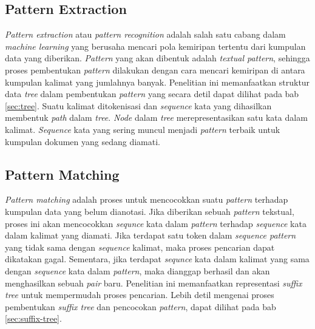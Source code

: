 \subsection{Pattern Extraction}
\textit{Pattern extraction} atau \textit{pattern recognition} adalah salah satu cabang dalam \textit{machine learning} yang berusaha mencari pola kemiripan tertentu dari kumpulan data yang diberikan. \textit{Pattern} yang akan dibentuk adalah \textit{textual pattern}, sehingga proses pembentukan \textit{pattern} dilakukan dengan cara mencari kemiripan di antara kumpulan kalimat yang jumlahnya banyak. Penelitian ini memanfaatkan struktur data \textit{tree} dalam pembentukan \textit{pattern} yang secara detil dapat dilihat pada bab \ref{sec:tree}. Suatu kalimat ditokenisasi dan \textit{sequence} kata yang dihasilkan membentuk \textit{path} dalam \textit{tree}. \textit{Node} dalam \textit{tree} merepresentasikan satu kata dalam kalimat. \textit{Sequence} kata yang sering muncul menjadi \textit{pattern} terbaik untuk kumpulan dokumen yang sedang diamati. 

\subsection{Pattern Matching}
\textit{Pattern matching} adalah proses untuk mencocokkan suatu \textit{pattern} terhadap kumpulan data yang belum dianotasi. Jika diberikan sebuah \textit{pattern} tekstual, proses ini akan mencocokkan \textit{sequnce} kata dalam \textit{pattern} terhadap \textit{sequence} kata dalam kalimat yang diamati. Jika terdapat satu token dalam \textit{sequence pattern} yang tidak sama dengan \textit{sequence} kalimat, maka proses pencarian dapat dikatakan gagal. Sementara, jika terdapat \textit{sequnce} kata dalam kalimat yang sama dengan \textit{sequence} kata dalam \textit{pattern}, maka dianggap berhasil dan akan menghasilkan sebuah \textit{pair} baru. Penelitian ini memanfaatkan representasi \textit{suffix tree} untuk mempermudah proses pencarian. Lebih detil mengenai proses pembentukan \textit{suffix tree} dan pencocokan \textit{pattern}, dapat dilihat pada bab \ref{sec:suffix-tree}.


